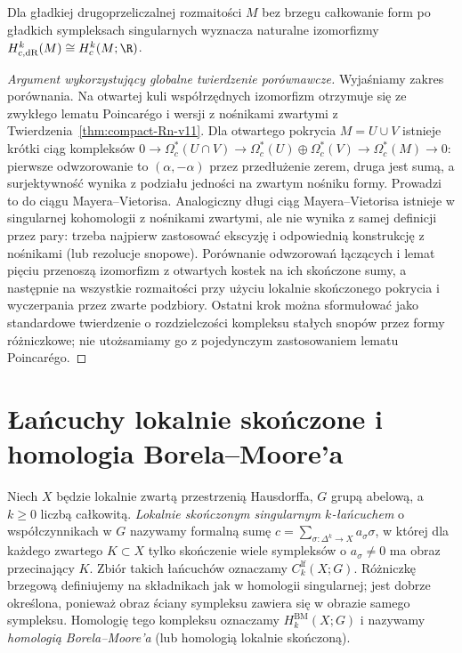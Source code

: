 \begin{twierdzenie}
\label{thm:compact-deRham-v11}
Dla gładkiej drugoprzeliczalnej rozmaitości $M$ bez brzegu
całkowanie
form po gładkich sympleksach singularnych wyznacza
naturalne izomorfizmy
$H_{c,\mathrm{dR}}^k(M)\cong H_c^k(M;\R)$.
\end{twierdzenie}
\begin{proof}[Argument wykorzystujący globalne twierdzenie porównawcze]
Wyjaśniamy zakres porównania. Na otwartej kuli
współrzędnych izomorfizm otrzymuje się ze zwykłego
lematu Poincarégo i wersji z nośnikami zwartymi
z Twierdzenia~\ref{thm:compact-Rn-v11}.
Dla otwartego pokrycia $M=U\cup V$ istnieje krótki ciąg
kompleksów
$0\to\Omega_c^*(U\cap V)\to
\Omega_c^*(U)\oplus\Omega_c^*(V)\to
\Omega_c^*(M)\to0$:
pierwsze odwzorowanie to $(\alpha,-\alpha)$ przez przedłużenie
zerem, druga jest sumą, a surjektywność wynika z podziału
jedności na zwartym nośniku formy. Prowadzi to do ciągu
Mayera--Vietorisa. Analogiczny długi ciąg Mayera--Vietorisa istnieje
w singularnej kohomologii z nośnikami zwartymi,
ale nie wynika z samej definicji przez pary:
trzeba najpierw zastosować ekscyzję i odpowiednią
konstrukcję z nośnikami (lub rezolucje snopowe).
Porównanie odwzorowań łączących i lemat pięciu przenoszą
izomorfizm z otwartych kostek na ich skończone sumy,
a następnie na wszystkie rozmaitości przy użyciu
lokalnie skończonego pokrycia i wyczerpania przez
zwarte podzbiory. Ostatni krok można sformułować jako
standardowe twierdzenie o rozdzielczości kompleksu
stałych snopów przez formy różniczkowe; nie utożsamiamy
go z pojedynczym zastosowaniem lematu Poincarégo.
\end{proof}

\section{Łańcuchy lokalnie skończone i homologia Borela--Moore'a}
\begin{definicja}
\label{def:BM-chain-v11}
Niech $X$ będzie lokalnie zwartą przestrzenią Hausdorffa,
$G$ grupą abelową, a $k\ge0$ liczbą całkowitą.
\emph{Lokalnie skończonym singularnym $k$-łańcuchem}
o współczynnikach w $G$ nazywamy formalną sumę
$c=\sum_{\sigma:\Delta^k\to X}a_\sigma\sigma$,
w której dla każdego zwartego $K\subset X$ tylko
skończenie wiele sympleksów o $a_\sigma\ne0$
ma obraz przecinający $K$. Zbiór takich łańcuchów
oznaczamy $C_k^{\mathrm{lf}}(X;G)$.
Różniczkę brzegową definiujemy na składnikach jak
w homologii singularnej; jest dobrze określona,
ponieważ obraz ściany sympleksu zawiera się w obrazie
samego sympleksu. Homologię tego kompleksu oznaczamy
$H_k^{\mathrm{BM}}(X;G)$ i nazywamy
\emph{homologią Borela--Moore'a} (lub homologią lokalnie skończoną).
\end{definicja}

